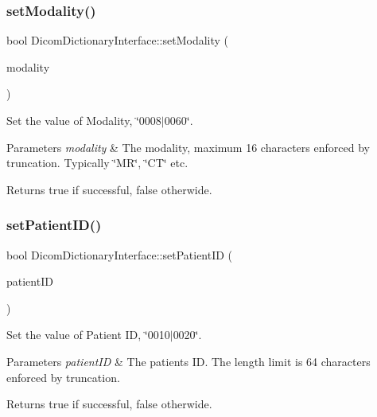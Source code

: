 \subsubsection{\texorpdfstring{set\+Modality()}{setModality()}}
{\footnotesize\ttfamily bool Dicom\+Dictionary\+Interface\+::set\+Modality (\begin{DoxyParamCaption}\item[{Q\+String}]{modality }\end{DoxyParamCaption})}



Set the value of Modality, \char`\"{}0008$\vert$0060\char`\"{}. 


\begin{DoxyParams}{Parameters}
{\em modality} & The modality, maximum 16 characters enforced by truncation. Typically \char`\"{}\+M\+R\char`\"{}, \char`\"{}\+C\+T\char`\"{} etc. \\
\hline
\end{DoxyParams}
\begin{DoxyReturn}{Returns}
true if successful, false otherwide. 
\end{DoxyReturn}
\mbox{\label{class_dicom_dictionary_interface_aaaf4f3a64da678b7121cea7e1a061eea}} 
\subsubsection{\texorpdfstring{set\+Patient\+I\+D()}{setPatientID()}}
{\footnotesize\ttfamily bool Dicom\+Dictionary\+Interface\+::set\+Patient\+ID (\begin{DoxyParamCaption}\item[{Q\+String}]{patient\+ID }\end{DoxyParamCaption})}



Set the value of Patient ID, \char`\"{}0010$\vert$0020\char`\"{}. 


\begin{DoxyParams}{Parameters}
{\em patient\+ID} & The patient\textquotesingle{}s ID. The length limit is 64 characters enforced by truncation. \\
\hline
\end{DoxyParams}
\begin{DoxyReturn}{Returns}
true if successful, false otherwide. 
\end{DoxyReturn}
\mbox{\label{class_dicom_dictionary_interface_af19c49b1768625cfb987032e336a0bfd}} 
